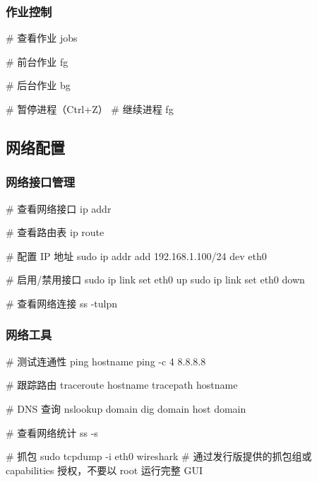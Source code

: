 \subsubsection{作业控制}


\begin{lstcode}[numbers=none]
  # 查看作业
  jobs

  # 前台作业
  fg %

  # 后台作业
  bg %

  # 暂停进程（Ctrl+Z）
  # 继续进程
  fg
\end{lstcode}

\subsection{网络配置}

\subsubsection{网络接口管理}


\begin{lstcode}[numbers=none]
  # 查看网络接口
  ip addr

  # 查看路由表
  ip route

  # 配置 IP 地址
  sudo ip addr add 192.168.1.100/24 dev eth0

  # 启用/禁用接口
  sudo ip link set eth0 up
  sudo ip link set eth0 down

  # 查看网络连接
  ss -tulpn
\end{lstcode}

\subsubsection{网络工具}


\begin{lstcode}[numbers=none]
  # 测试连通性
  ping hostname
  ping -c 4 8.8.8.8

  # 跟踪路由
  traceroute hostname
  tracepath hostname

  # DNS 查询
  nslookup domain
  dig domain
  host domain

  # 查看网络统计
  ss -s

  # 抓包
  sudo tcpdump -i eth0
  wireshark  # 通过发行版提供的抓包组或 capabilities 授权，不要以 root 运行完整 GUI
\end{lstcode}


